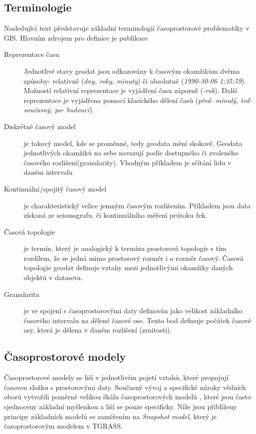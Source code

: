 \documentclass[a4paper,12pt,oneside]{report}
\begin{document}
\subsection{Terminologie}
\label{subsec:terminologie}
Nasledující text představuje základní terminologii časoprostorové problematiky v GIS. Hlavním zdrojem pro definice je publikace \cite{pelekis}
\begin{description}
\item[Reprezentace času] Jednotlivé stavy geodat jsou odkazovány k  časovým okamžikům dvěma způsoby- relativně  (\textit{dny, roky, minuty})  či absolutně (\textit{1990-30-06 1:35:59}). Možností relativní reprezentace je vyjádření času záporně (\textit{-rok}). Další reprezentace je vyjádřena pomocí klasického dělení časů (\textit {před- minulý, teď- současný, po- budoucí}).

\item[Diskrétně časový model] je takový model, kde se proměnné, tedy geodata  mění skokově. Geodata jednotlivých okamžiků na sebe navazují podle dostupného či zvoleného časového rozlišení(granularity). Vhodným příkladem je sčítání lidu v daném intervalu

\item[Kontinuální/spojitý časový model] je charakteristický velice jemným časovým rozlišením. Příkladem jsou data získaná ze seismografu, či kontinuálního měření průtoku řek.

\item[Časová topologie] je termín, který je analogický k termínu prostorová topologie s tím  rozdílem, že se jedná mimo prostorový rozměr i o rozměr časový. Časová topologie geodat definuje vztahy mezi jednotlivými okamžiky daných objektů v datasetu.

\item[Granularita] je ve spojení s časoprostorovými daty definován jako velikost základního časového intervalu na dělené časové ose. Tento bod definuje počátek časové osy, která je dělena v daném rozlišení (zrnitosti). 
\end{description}

\subsection{Časoprostorové modely}

Časoprostorové modely se liší v jednotlivém pojetí vztahů, které propojují časovou složku s prostorovými daty. Současný vývoj a specifické nároky vědních oborů vytvořili poměrně velikou škálu časoprostorových modelů \cite{pelekis}, které jsou často sjednoceny  základní myšlenkou a liší se pouze specificky. Níže jsou přiblíženy principy základních modelů se zaměřením na \textit{Snapshot model}, který je časoprostorovým modelem v TGRASS.
\end{document}
